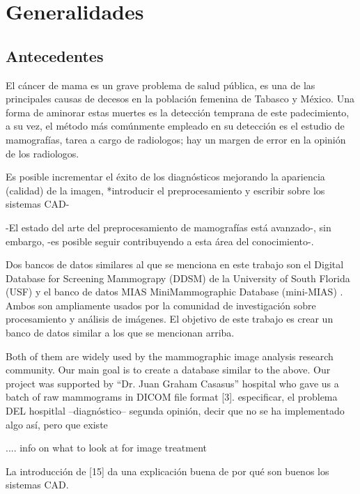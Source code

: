 \chapter{Generalidades}

 \setcounter{page}{1}

\section{Antecedentes}

El cáncer de mama es un grave problema de salud pública, es una de las
principales causas de decesos en la población femenina de Tabasco y México. Una 
forma de aminorar estas muertes es la detección temprana de este padecimiento, a
su vez, el método más comúnmente empleado en su detección es el estudio de
mamografías, tarea a cargo de radiologos; hay un margen de error en la opinión
de los radiologos.

Es posible incrementar el éxito de los diagnósticos mejorando la apariencia
(calidad) de la imagen, *introducir el preprocesamiento y escribir sobre los
sistemas CAD-

-El estado del arte del preprocesamiento de mamografías está avanzado-, sin embargo,
-es posible seguir contribuyendo a esta área del conocimiento-. 

Dos bancos de datos similares al que se menciona en este trabajo son el Digital
Database for Screening Mammograpy (DDSM) de la University of South Florida
(USF) \cite{heath2000digital} y el banco de datos MIAS MiniMammographic
Database (mini-MIAS) \cite{sucklingmini}. Ambos son ampliamente usados por la
comunidad de investigación sobre procesamiento y análisis de imágenes. El
objetivo de este trabajo es crear un banco de datos similar a los que se
mencionan arriba. 

Both of them are widely used by the mammographic image analysis research
community.  Our main goal is to create a database similar to the above.  Our
project was supported by “Dr. Juan Graham Casasus” hospital who gave us a batch
of raw mammograms in DICOM file format [3].  especificar, el problema DEL
hospitlal --diagnóstico-- segunda opinión, decir que no se ha implementado algo
así, pero que existe
 
.... info on what to look at for image treatment 

La introducción de [15] da una explicación buena de por qué son buenos los
sistemas CAD.

